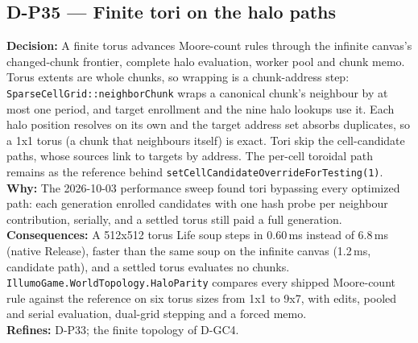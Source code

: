 \subsection*{D-P35 --- Finite tori on the halo paths}
\begin{decisionbox}[title={D-P35 \quad 2026-10-03}]
\textbf{Decision:} A finite torus advances Moore-count rules through the
infinite canvas's changed-chunk frontier, complete halo evaluation, worker pool
and chunk memo. Torus extents are whole chunks, so wrapping is a chunk-address
step: \texttt{SparseCellGrid::neighborChunk} wraps a canonical chunk's
neighbour by at most one period, and target enrollment and the nine halo
lookups use it. Each halo position resolves on its own and the target address
set absorbs duplicates, so a 1x1 torus (a chunk that neighbours itself) is
exact. Tori skip the cell-candidate paths, whose sources link to targets by
address. The per-cell toroidal path remains as the reference behind
\texttt{setCellCandidateOverrideForTesting(1)}.\\
\textbf{Why:} The 2026-10-03 performance sweep found tori bypassing every
optimized path: each generation enrolled candidates with one hash probe per
neighbour contribution, serially, and a settled torus still paid a full
generation.\\
\textbf{Consequences:} A 512x512 torus Life soup steps in 0.60\,ms instead of
6.8\,ms (native Release), faster than the same soup on the infinite canvas
(1.2\,ms, candidate path), and a settled torus evaluates no chunks.
\texttt{IllumoGame.WorldTopology.HaloParity} compares every shipped Moore-count
rule against the reference on six torus sizes from 1x1 to 9x7, with edits,
pooled and serial evaluation, dual-grid stepping and a forced memo.\\
\textbf{Refines:} D-P33; the finite topology of D-GC4.
\end{decisionbox}

